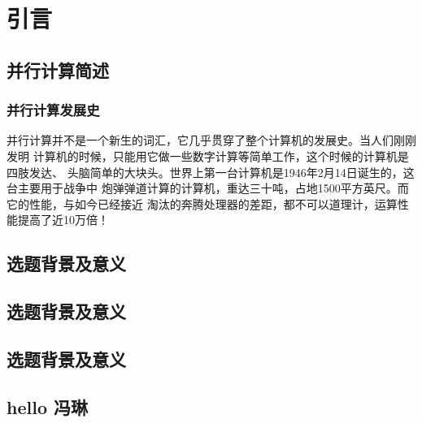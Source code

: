 

\chapter{引言}


\section{并行计算简述}

\subsection{并行计算发展史}
并行计算并不是一个新生的词汇，它几乎贯穿了整个计算机的发展史。当人们刚刚发明
计算机的时候，只能用它做一些数字计算等简单工作，这个时候的计算机是四肢发达、
头脑简单的大块头。世界上第一台计算机是1946年2月14日诞生的，这台主要用于战争中
炮弹弹道计算的计算机，重达三十吨，占地1500平方英尺。而它的性能，与如今已经接近
淘汰的奔腾处理器的差距，都不可以道理计，运算性能提高了近10万倍！

\section{选题背景及意义}
\section{选题背景及意义}
\section{选题背景及意义}
\section{hello 冯琳}
